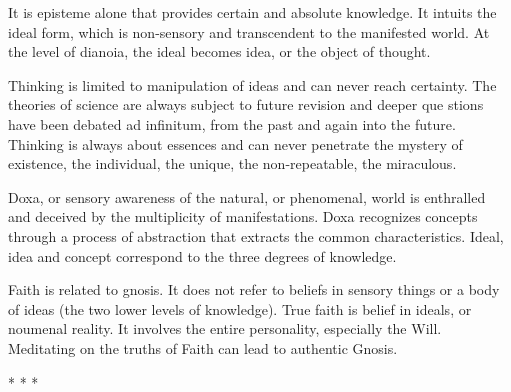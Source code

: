 It is episteme alone that provides certain and absolute knowledge. It intuits the ideal form, which is non-sensory and transcendent to the manifested world. At the level of dianoia, the ideal becomes idea, or the object of thought.

Thinking is limited to manipulation of ideas and can never reach certainty. The theories of science are always subject to future revision and deeper que stions have been debated ad infinitum, from the past and again into the future. Thinking is always about essences and can never penetrate the mystery of existence, the individual, the unique, the non-repeatable, the miraculous.

Doxa, or sensory awareness of the natural, or phenomenal, world is enthralled and deceived by the multiplicity of manifestations. Doxa recognizes concepts through a process of abstraction that extracts the common characteristics. Ideal, idea and concept correspond to the three degrees of knowledge.

Faith is related to gnosis. It does not refer to beliefs in sensory things or a body of ideas (the two lower levels of knowledge). True faith is belief in ideals, or noumenal reality. It involves the entire personality, especially the Will. Meditating on the truths of Faith can lead to authentic Gnosis.



\begin{center}* * *\end{center}

